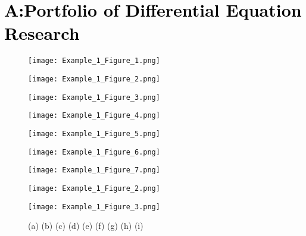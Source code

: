 \documentclass{ResumeDesignFormat2}
\begin{document}
\section{\textcolor{black}{A:Portfolio of Differential Equation Research}}


\begin{figure}[h]
\centering
\begin{minipage}[b]{0.3\linewidth}
\texttt{[image: Example\_1\_Figure\_1.png]}
\end{minipage}\hfill
\begin{minipage}[b]{0.3\linewidth}
\texttt{[image: Example\_1\_Figure\_2.png]}
\end{minipage}\hfill	
\begin{minipage}[b]{0.3\linewidth}
\texttt{[image: Example\_1\_Figure\_3.png]}
\end{minipage}\hfill
\begin{minipage}[b]{0.3\linewidth}
\texttt{[image: Example\_1\_Figure\_4.png]}
\end{minipage}\hfill
\begin{minipage}[b]{0.3\linewidth}
\texttt{[image: Example\_1\_Figure\_5.png]}
\end{minipage}\hfill	
\begin{minipage}[b]{0.3\linewidth}
\texttt{[image: Example\_1\_Figure\_6.png]}
\end{minipage}\hfill
\begin{minipage}[b]{0.3\linewidth}
\texttt{[image: Example\_1\_Figure\_7.png]}
\end{minipage}\hfill
\begin{minipage}[b]{0.3\linewidth}
\texttt{[image: Example\_1\_Figure\_2.png]}
\end{minipage}\hfill	
\begin{minipage}[b]{0.3\linewidth}
\texttt{[image: Example\_1\_Figure\_3.png]}
\end{minipage}\hfill
\caption{(a) (b) (c) (d) (e) (f) (g) (h) (i) }
\label{fig:Figure1}
\end{figure} 
\end{document}
